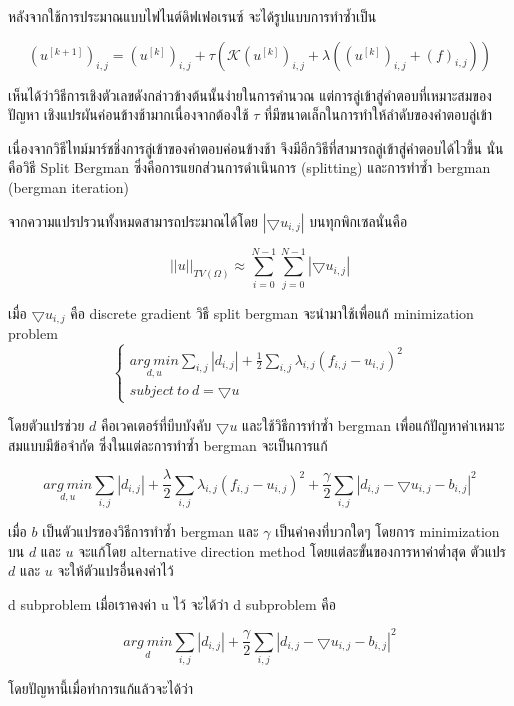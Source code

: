 \documentclass[hidelinks,a4paper,14pt]{article}
\numberwithin{equation}{section}							%
\begin{document}
{		หลังจากใช้การประมาณแบบไฟไนต์ดิฟเฟอเรนซ์ จะได้รูปแบบการทำซ้ำเป็น
		
		$$ (u^{[k+1]})_{i,j} = (u^{[k]})_{i,j}+\tau\left(  \mathcal{K}(u^{[k]})_{i,j}+\lambda((u^{[k]})_{i,j}+(f)_{i,j})\right) $$
		
		เห็นได้ว่าวิธีการเชิงตัวเลขดังกล่าวข้างต้นนั้นง่ายในการคํานวณ แต่การลู่เข้าสู่คําตอบที่เหมาะสมของปัญหา เชิงแปรผันค่อนข้างช้ามากเนื่องจากต้องใช้ $\tau$ ที่มีขนาดเล็กในการทำให้ลำดับของคำตอบลู่เข้า 
	
		เนื่องจากวิธีไทม์มาร์ชชิ่งการลู่เข้าของคำตอบค่อนข้างช้า จึงมีอีกวิธีที่สามารถลู่เข้าสู่คำตอบได้ไวขึ้น  นั่นคือวิธี Split Bergman \cite{ref:splitbergman-inpaint} ซึ่งคือการแยกส่วนการดำเนินการ (splitting) และการทำซ้ำ bergman (bergman iteration)
		
		จากความแปรปรวนทั้งหมดสามารถประมาณได้โดย $ |\bigtriangledown u_{i,j} | $ บนทุกพิกเซลนั่นคือ
		
		$$ ||u||_{TV(\Omega)} \approx \sum_{i=0}^{N-1} \sum_{j=0}^{N-1} |\bigtriangledown u_{i,j}| $$
		
		เมื่อ $\bigtriangledown u_{i,j}$  คือ discrete gradient วิธี split bergman  จะนำมาใช้เพื่อแก้ minimization problem 
		$$
		\left\{ \begin{array}{lc} 
		\underset{d , u}{arg \ min}\sum_{i,j}|d_{i,j}|+\frac{1}{2}\sum_{i,j}\lambda_{i,j}(f_{i,j} - u_{i,j})^2 \\
		subject \ to \ d = \bigtriangledown u 
		\end{array} \right .
		$$
		
		โดยตัวแปรช่วย $d$  คือเวคเตอร์ที่บีบบังคับ $ \bigtriangledown u$ และใช้วิธีการทำซ้ำ bergman เพื่อแก้ปัญหาค่าเหมาะสมแบบมีข้อจำกัด ซึ่งในแต่ละการทำซ้ำ bergman จะเป็นการแก้
		
		$$\underset{d , u}{arg \ min}\sum_{i,j}|d_{i,j}|+\frac{\lambda}{2}\sum_{i,j}\lambda_{i,j}(f_{i,j} - u_{i,j})^2 + \frac{\gamma}{2} \sum_{i,j} |d_{i,j} - \bigtriangledown u_{i,j}- b_{i,j}|^2 $$
		
		เมื่อ $b$  เป็นตัวแปรของวิธีการทำซ้ำ bergman และ $\gamma$ เป็นค่าคงที่บวกใดๆ โดยการ minimization  บน $d$ และ $u$  จะแก้โดย alternative direction method โดยแต่ละขั้นของการหาค่าต่ำสุด ตัวแปร $d$ และ $u$ จะให้ตัวแปรอื่นคงค่าไว้
		
		d subproblem เมื่อเราคงค่า u ไว้ จะได้ว่า d subproblem คือ
		
		$$ \underset{d}{arg \ min} \sum_{i,j} |d_{i,j}| + \frac{\gamma}{2} \sum_{i,j}|d_{i,j} - \bigtriangledown u_{i,j} - b_{i,j}|^2$$
		
		โดยปัญหานี้เมื่อทำการแก้แล้วจะได้ว่า 
		
}
\end{document}
